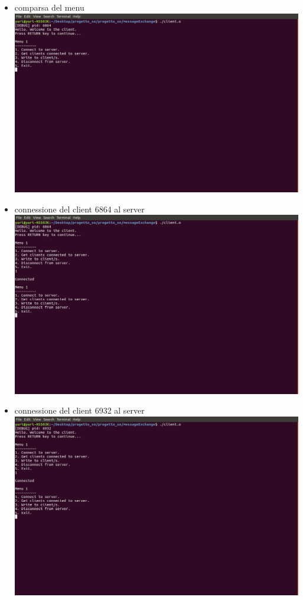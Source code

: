\begin{itemize}
\item comparsa del menu \\
\includegraphics[scale=0.3]{screenmsg/2_client_6864}
\newpage
\item connessione del client 6864 al server \\
\includegraphics[scale=0.4]{screenmsg/3_client_6864}

\item connessione del client 6932 al server \\
\includegraphics[scale=0.4]{screenmsg/4_client_6932}


\end{itemize}


